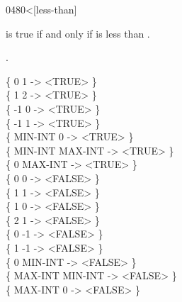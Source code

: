 \begin{worddef}[less]{0480}{<}[less-than]
\item {}

	 is true if and only if  is less than
	.

\see {}.

	\begin{defer}
	\testing
		\{       0       1  -> <TRUE>  \} \\
		\{       1       2  -> <TRUE>  \} \\
		\{      -1       0  -> <TRUE>  \} \\
		\{      -1       1  -> <TRUE>  \} \\
		\{ MIN-INT       0  -> <TRUE>  \} \\
		\{ MIN-INT MAX-INT  -> <TRUE>  \} \\
		\{       0 MAX-INT  -> <TRUE>  \} \\
		\{       0       0  -> <FALSE> \} \\
		\{       1       1  -> <FALSE> \} \\
		\{       1       0  -> <FALSE> \} \\
		\{       2       1  -> <FALSE> \} \\
		\{       0      -1  -> <FALSE> \} \\
		\{       1      -1  -> <FALSE> \} \\
		\{       0 MIN-INT  -> <FALSE> \} \\
		\{ MAX-INT MIN-INT  -> <FALSE> \} \\
		\{ MAX-INT       0  -> <FALSE> \}
	\end{defer}
\end{worddef}




